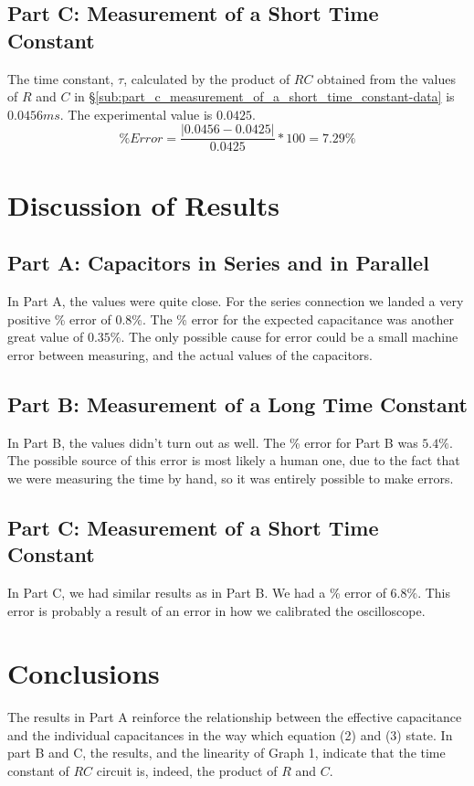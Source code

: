 \documentclass[titlepage]{article}
\begin{document}
\subsection{Part C: Measurement of a Short Time Constant}\label{sub:part_c_measurement_of_a_short_time_constant-analysis}
The time constant, $\tau$, calculated by the product of $RC$ obtained from the values of $R$ and $C$ in \S \ref{sub:part_c_measurement_of_a_short_time_constant-data} is $0.0456 ms$. The experimental value is $0.0425$.
\[
	\% Error = \frac{|0.0456 - 0.0425|}{0.0425} * 100 = 7.29 \%
\]

\section{Discussion of Results}\label{sec:discussion_of_results}
\subsection{Part A: Capacitors in Series and in Parallel}\label{sub:part_a_capacitors_in_series_and_in_parallel-results}
In Part A, the values were quite close. For the series connection we landed a very positive \% error of $0.8 \%$. The \% error for the expected capacitance was another great value of $0.35 \%$. The only possible cause for error could be a small machine error between measuring, and the actual values of the capacitors.

\subsection{Part B: Measurement of a Long Time Constant}\label{sub:part_b_measurement_of_a_long_time_constant-results}
In Part B, the values didn't turn out as well. The \% error for Part B was $5.4 \%$. The possible source of this error is most likely a human one, due to the fact that we were measuring the time by hand, so it was entirely possible to make errors.

\subsection{Part C: Measurement of a Short Time Constant}\label{sub:part_c_measurement_of_a_short_time_constant-results}
In Part C, we had similar results as in Part B. We had a \% error of $6.8 \%$. This error is probably a result of an error in how we calibrated the oscilloscope.

\section{Conclusions}\label{sec:conclusions}
The results in Part A reinforce the relationship between the effective 
capacitance and the individual capacitances in the way which equation (2) 
and (3) state. In part B and C, the results, and the linearity of Graph 1, 
indicate that the time constant of $RC$ circuit is, indeed, the product of $R$ and 
$C$.
\end{document}
